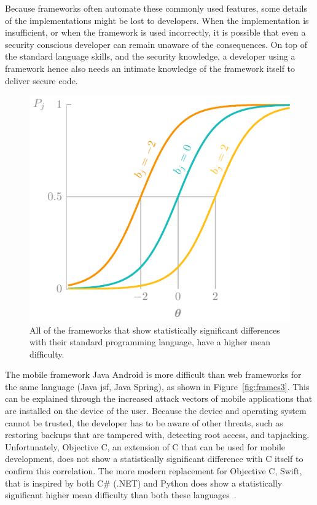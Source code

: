 Because frameworks often automate these commonly used features, some details of the implementations might be lost to developers.
When the implementation is insufficient, or when the framework is used incorrectly, it is possible that even a security conscious developer can remain unaware of the consequences.
On top of the standard language skills, and the security knowledge, a developer using a framework hence also needs an intimate knowledge of the framework itself to deliver secure code.

\begin{figure}
    \centering
    \includegraphics[page=10]{03-education/figures/tikzfigures.pdf}
    \caption[Frameworks versus default languages]{All of the frameworks that show statistically significant differences with their standard programming language, have a higher mean difficulty.}
    \label{fig:frames2}
\end{figure}

The mobile framework Java Android is more difficult than web frameworks for the same language (Java \gls{jsf}, Java Spring), as shown in Figure~\ref{fig:frames3}.
This can be explained through the increased attack vectors of mobile applications that are installed on the device of the user.
Because the device and operating system cannot be trusted, the developer has to be aware of other threats, such as restoring backups that are tampered with, detecting root access, and tapjacking.
Unfortunately, Objective C, an extension of C that can be used for mobile development, does not show a statistically significant difference with C itself to confirm this correlation.
The more modern replacement for Objective C, Swift, that is inspired by both C\# (.NET) and Python does show a statistically significant higher mean difficulty than both these languages~\cite{nondot}.

